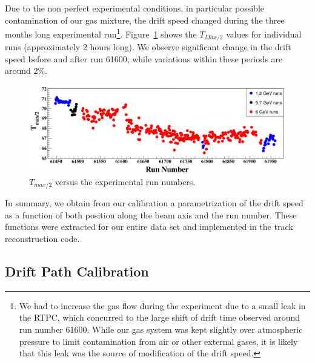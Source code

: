 \documentclass[preprint,5p]{elsarticle}
\begin{document}
Due to the non perfect experimental conditions, in particular possible contamination 
of our gas mixture, the drift speed changed during the three months long experimental 
run\footnote{We had to increase the gas flow during the experiment due to a small leak 
in the RTPC, which concurred to the large shift of drift time observed around 
run number 61600. While our gas system was kept slightly over atmospheric 
pressure to limit contamination from air or other external gases, it is likely 
that this leak was the source of modification of the drift speed.}.  
Figure~\ref{fig:Drift_run_number_1} shows the $T_{Max/2}$ values for individual 
runs (approximately 2 hours long). We observe significant change in the drift 
speed before and after run 61600, while variations within these periods are 
around 2\%. 

\begin{figure}[tb]
\centering
\includegraphics[width=15.5cm]{Drift_run_number.pdf}
\caption{$T_{max/2}$ versus the experimental run numbers.} 
\label{fig:Drift_run_number_1}
\end{figure}

In summary, we obtain from our calibration a parametrization of the drift speed 
as a function of both position along the beam axis and the run number.  These 
functions were extracted for our entire data set and implemented in the track 
reconstruction code.
   
\subsection{Drift Path Calibration}
\end{document}
